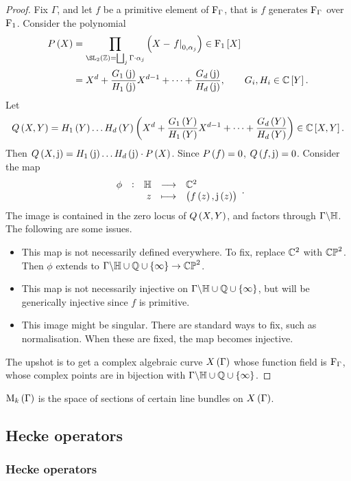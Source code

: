 \begin{proof}
Fix $ \Gamma $, and let $ f $ be a primitive element of $ \mathrm{F}_\Gamma $, that is $ f $ generates $ \mathrm{F}_\Gamma $ over $ \mathrm{F}_1 $. Consider the polynomial
\begin{align*}
P\br{X}
& = \prod_{\SL_2\br{\ZZ} = \bigsqcup_j \Gamma \cdot \alpha_j} \br{X - \eval{f}_{0, \alpha_j}} \in \F_1\sbr{X} \\
& = X^d + \dfrac{G_1\br{\j}}{H_1\br{\j}}X^{d - 1} + \dots + \dfrac{G_d\br{\j}}{H_d\br{\j}}, \qquad G_i, H_i \in \CC\sbr{Y}.
\end{align*}
Let
$$ Q\br{X, Y} = H_1\br{Y} \dots H_d\br{Y}\br{X^d + \dfrac{G_1\br{Y}}{H_1\br{Y}}X^{d - 1} + \dots + \dfrac{G_d\br{Y}}{H_d\br{Y}}} \in \CC\sbr{X, Y}. $$
Then $ Q\br{X, \j} = H_1\br{\j} \dots H_d\br{\j} \cdot P\br{X} $. Since $ P\br{f} = 0 $, $ Q\br{f, \j} = 0 $. Consider the map
$$ \function[\phi]{\HH}{\CC^2}{z}{\br{f\br{z}, \j\br{z}}}. $$
The image is contained in the zero locus of $ Q\br{X, Y} $, and factors through $ \Gamma \backslash \mathbb{H} $. The following are some issues.
\begin{itemize}
\item This map is not necessarily defined everywhere. To fix, replace $ \mathbb{C}^2 $ with $ \mathbb{CP}^2 $. Then $ \phi $ extends to $ \Gamma \backslash \HH \cup \QQ \cup \cbr{\infty} \to \CP^2 $.
\item This map is not necessarily injective on $ \Gamma \backslash \HH \cup \QQ \cup \cbr{\infty} $, but will be generically injective since $ f $ is primitive.
\item This image might be singular. There are standard ways to fix, such as normalisation. When these are fixed, the map becomes injective.
\end{itemize}
The upshot is to get a complex algebraic curve $ X\br{\Gamma} $ whose function field is $ \mathrm{F}_\Gamma $, whose complex points are in bijection with $ \Gamma \backslash \HH \cup \QQ \cup \cbr{\infty} $.
\end{proof}

$ \M_k\br{\Gamma} $ is the space of sections of certain line bundles on $ X\br{\Gamma} $.

\pagebreak

\subsection{Hecke operators}

\subsubsection{Hecke operators}

